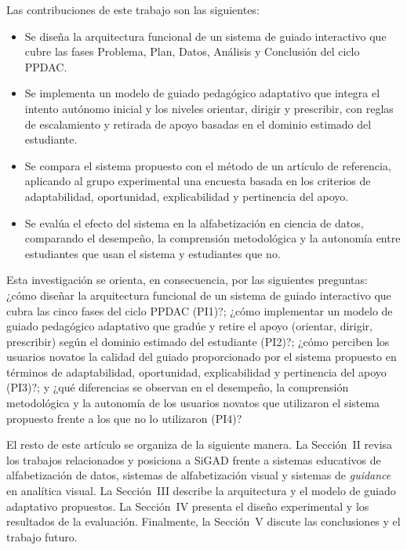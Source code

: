 \documentclass[10pt,journal,compsoc]{IEEEtran}
\begin{document}
Las contribuciones de este trabajo son las siguientes:
\begin{itemize}
\item Se diseña la arquitectura funcional de un sistema de guiado interactivo
que cubre las fases Problema, Plan, Datos, Análisis y Conclusión del ciclo
PPDAC.
\item Se implementa un modelo de guiado pedagógico adaptativo que integra el
intento autónomo inicial y los niveles orientar, dirigir y prescribir, con
reglas de escalamiento y retirada de apoyo basadas en el dominio estimado del
estudiante.
\item Se compara el sistema propuesto con el método de un artículo de
referencia, aplicando al grupo experimental una encuesta basada en los
criterios de adaptabilidad, oportunidad, explicabilidad y pertinencia del
apoyo.
\item Se evalúa el efecto del sistema en la alfabetización en ciencia de
datos, comparando el desempeño, la comprensión metodológica y la autonomía
entre estudiantes que usan el sistema y estudiantes que no.
\end{itemize}

Esta investigación se orienta, en consecuencia, por las siguientes preguntas:
¿cómo diseñar la arquitectura funcional de un sistema de guiado interactivo
que cubra las cinco fases del ciclo PPDAC (PI1)?; ¿cómo implementar un modelo
de guiado pedagógico adaptativo que gradúe y retire el apoyo (orientar,
dirigir, prescribir) según el dominio estimado del estudiante (PI2)?; ¿cómo
perciben los usuarios novatos la calidad del guiado proporcionado por el
sistema propuesto en términos de adaptabilidad, oportunidad, explicabilidad y
pertinencia del apoyo (PI3)?; y ¿qué diferencias se observan en el
desempeño, la comprensión metodológica y la autonomía de los usuarios
novatos que utilizaron el sistema propuesto frente a los que no lo utilizaron
(PI4)?

El resto de este artículo se organiza de la siguiente manera. La Sección~II
revisa los trabajos relacionados y posiciona a SiGAD frente a sistemas
educativos de alfabetización de datos, sistemas de alfabetización visual y
sistemas de \textit{guidance} en analítica visual. La Sección~III describe la
arquitectura y el modelo de guiado adaptativo propuestos. La Sección~IV
presenta el diseño experimental y los resultados de la evaluación.
Finalmente, la Sección~V discute las conclusiones y el trabajo futuro.
\end{document}
